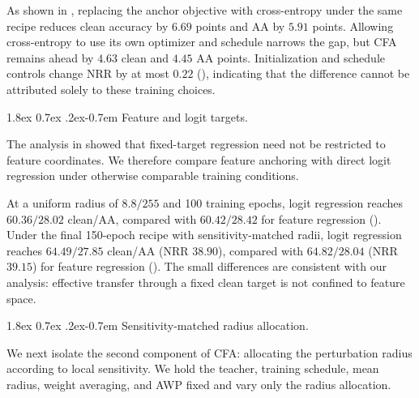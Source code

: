 \documentclass{article} %
\makeatletter
\theoremstyle{plain}
\renewcommand{\paragraph}{\@startsection{paragraph}{4}{\z@}%
  {1.8ex \@plus 0.7ex \@minus .2ex}{-0.7em}%
  {\normalfont\normalsize\bfseries}}
\makeatother
\begin{document}
As shown in , replacing the anchor objective with
cross-entropy under the same recipe reduces clean accuracy by \(6.69\)
points and AA by \(5.91\) points.
Allowing cross-entropy to use its own optimizer and schedule narrows the gap,
but CFA remains ahead by \(4.63\) clean and \(4.45\) AA points.
Initialization and schedule controls change NRR by at most \(0.22\)
(), indicating that the difference cannot be attributed
solely to these training choices.


\paragraph{Feature and logit targets.}

The analysis in  showed that fixed-target regression need
not be restricted to feature coordinates.
We therefore compare feature anchoring with direct logit regression under
otherwise comparable training conditions.

At a uniform radius of \(8.8/255\) and 100 training epochs, logit regression
reaches \(60.36/28.02\) clean/AA, compared with \(60.42/28.42\) for
feature regression ().
Under the final 150-epoch recipe with sensitivity-matched radii, logit
regression reaches \(64.49/27.85\) clean/AA (NRR \(38.90\)), compared with
\(64.82/28.04\) (NRR \(39.15\)) for feature regression
().
The small differences are consistent with our analysis: effective transfer
through a fixed clean target is not confined to feature space.


\paragraph{Sensitivity-matched radius allocation.}

We next isolate the second component of CFA: allocating the perturbation
radius according to local sensitivity.
We hold the teacher, training schedule, mean radius, weight averaging, and
AWP fixed and vary only the radius allocation.
\end{document}
